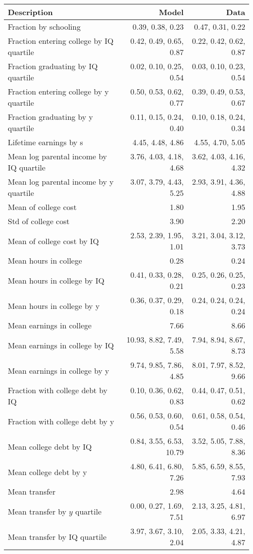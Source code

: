 \begin{tabular}{lrr}
\hline
Description & Model  & Data  \\
\hline
Fraction by schooling & 0.39, 0.38, 0.23  & 0.47, 0.31, 0.22  \\
Fraction entering college by IQ quartile & 0.42, 0.49, 0.65, 0.87  & 0.22, 0.42, 0.62, 0.87  \\
Fraction graduating by IQ quartile & 0.02, 0.10, 0.25, 0.54  & 0.03, 0.10, 0.23, 0.54  \\
Fraction entering college by y quartile & 0.50, 0.53, 0.62, 0.77  & 0.39, 0.49, 0.53, 0.67  \\
Fraction graduating by y quartile & 0.11, 0.15, 0.24, 0.40  & 0.10, 0.18, 0.24, 0.34  \\
Lifetime earnings by s & 4.45, 4.48, 4.86  & 4.55, 4.70, 5.05  \\
Mean log parental income by IQ quartile & 3.76, 4.03, 4.18, 4.68  & 3.62, 4.03, 4.16, 4.32  \\
Mean log parental income by y quartile & 3.07, 3.79, 4.43, 5.25  & 2.93, 3.91, 4.36, 4.88  \\
Mean of college cost & 1.80  & 1.95  \\
Std of college cost & 3.90  & 2.20  \\
Mean of college cost by IQ & 2.53, 2.39, 1.95, 1.01  & 3.21, 3.04, 3.12, 3.73  \\
Mean hours in college & 0.28  & 0.24  \\
Mean hours in college by IQ & 0.41, 0.33, 0.28, 0.21  & 0.25, 0.26, 0.25, 0.23  \\
Mean hours in college by y & 0.36, 0.37, 0.29, 0.18  & 0.24, 0.24, 0.24, 0.24  \\
Mean earnings in college & 7.66  & 8.66  \\
Mean earnings in college by IQ & 10.93, 8.82, 7.49, 5.58  & 7.94, 8.94, 8.67, 8.73  \\
Mean earnings in college by y & 9.74, 9.85, 7.86, 4.85  & 8.01, 7.97, 8.52, 9.66  \\
Fraction with college debt by IQ & 0.10, 0.36, 0.62, 0.83  & 0.44, 0.47, 0.51, 0.62  \\
Fraction with college debt by y & 0.56, 0.53, 0.60, 0.54  & 0.61, 0.58, 0.54, 0.46  \\
Mean college debt by IQ & 0.84, 3.55, 6.53, 10.79  & 3.52, 5.05, 7.88, 8.36  \\
Mean college debt by y & 4.80, 6.41, 6.80, 7.26  & 5.85, 6.59, 8.55, 7.93  \\
Mean transfer & 2.98  & 4.64  \\
Mean transfer by $y$ quartile & 0.00, 0.27, 1.69, 7.51  & 2.13, 3.25, 4.81, 6.97  \\
Mean transfer by IQ quartile & 3.97, 3.67, 3.10, 2.04  & 2.05, 3.33, 4.21, 4.87  \\
\hline
\end{tabular}%
